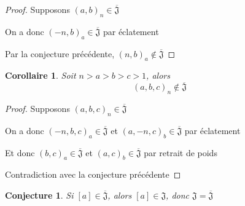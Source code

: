 \documentclass{article}
\newtheorem{conjecture}{Conjecture}
\newtheorem{corollary}{Corollaire}
\newcommand{\J}{\mathfrak{J}}
\newcommand{\JS}{\overline{\J}}
\begin{document}
\begin{proof}
    Supposons ${(a, b)}_n \in \JS$

    On a donc ${(-n, b)}_a \in \JS$ par éclatement

    Par la conjecture précédente, ${(n, b)}_a \not \in \JS$
\end{proof}

\begin{corollary}
    Soit $n > a > b > c > 1$, alors
    \[ {(a, b, c)}_n \not \in \JS \]
\end{corollary}

\begin{proof}
    Supposons ${(a, b, c)}_n \in \JS$

    On a donc ${(-n, b, c)}_a \in \JS$ et ${(a, -n, c)}_b \in \JS$ par éclatement

    Et donc ${(b, c)}_a \in \JS$ et ${(a, c)}_b \in \JS$ par retrait de poids

    Contradiction avec la conjecture précédente
\end{proof}

\begin{conjecture}
    Si $[a] \in \JS$, alors $[a] \in \J$, donc $\J = \JS$
\end{conjecture}
\end{document}
